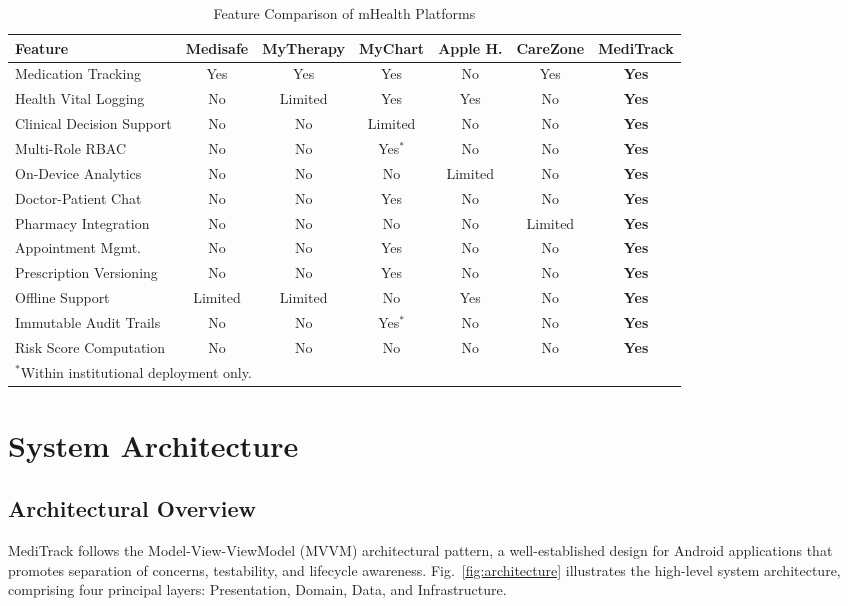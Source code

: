 \documentclass[journal,onecolumn,web]{ieeecolor}
\begin{document}
\begin{table}[!t]
\caption{Feature Comparison of mHealth Platforms}
\label{tab:comparison}
\centering\small
\begin{tabular}{l c c c c c c}
\toprule
{\bf Feature} & {\bf Medisafe} & {\bf MyTherapy}
& {\bf MyChart} & {\bf Apple H.} & {\bf CareZone}
& {\bf MediTrack} \\
\midrule
Medication Tracking & Yes & Yes & Yes
& No & Yes & {\bf Yes} \\
Health Vital Logging & No & Limited & Yes
& Yes & No & {\bf Yes} \\
Clinical Decision Support & No & No & Limited
& No & No & {\bf Yes} \\
Multi-Role RBAC & No & No & Yes$^*$
& No & No & {\bf Yes} \\
On-Device Analytics & No & No & No
& Limited & No & {\bf Yes} \\
Doctor-Patient Chat & No & No & Yes
& No & No & {\bf Yes} \\
Pharmacy Integration & No & No & No
& No & Limited & {\bf Yes} \\
Appointment Mgmt. & No & No & Yes
& No & No & {\bf Yes} \\
Prescription Versioning & No & No & Yes
& No & No & {\bf Yes} \\
Offline Support & Limited & Limited & No
& Yes & No & {\bf Yes} \\
Immutable Audit Trails & No & No & Yes$^*$
& No & No & {\bf Yes} \\
Risk Score Computation & No & No & No
& No & No & {\bf Yes} \\
\bottomrule
\multicolumn{7}{l}{\footnotesize $^*$Within
institutional deployment only.}
\end{tabular}
\end{table}


\section{System Architecture}
\label{sec:architecture}

\subsection{Architectural Overview}
MediTrack follows the Model-View-ViewModel (MVVM)
architectural pattern, a well-established design for
Android applications that promotes separation of
concerns, testability, and lifecycle awareness.
Fig.~\ref{fig:architecture} illustrates the high-level
system architecture, comprising four principal layers:
Presentation, Domain, Data, and Infrastructure.
\end{document}
